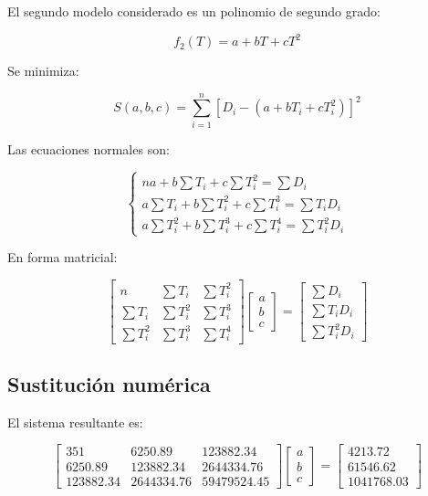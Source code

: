 \documentclass[12pt,a4paper]{article}
\newcommand{\modeloCuadratico}{f_2(T)=a+bT+cT^2}
\begin{document}
El segundo modelo considerado es un polinomio de segundo grado:

\[
    \modeloCuadratico
\]

Se minimiza:

\[
    S(a,b,c)=\sum_{i=1}^{n}\left[D_i-(a+bT_i+cT_i^2)\right]^2
\]

Las ecuaciones normales son:

\[
\begin{cases}
na + b\sum T_i + c\sum T_i^2 = \sum D_i \\
a\sum T_i + b\sum T_i^2 + c\sum T_i^3 = \sum T_iD_i \\
a\sum T_i^2 + b\sum T_i^3 + c\sum T_i^4 = \sum T_i^2D_i
\end{cases}
\]

En forma matricial:

\[
\begin{bmatrix}
n & \sum T_i & \sum T_i^2 \\
\sum T_i & \sum T_i^2 & \sum T_i^3 \\
\sum T_i^2 & \sum T_i^3 & \sum T_i^4
\end{bmatrix}
\begin{bmatrix}
a \\
b \\
c
\end{bmatrix}
=
\begin{bmatrix}
\sum D_i \\
\sum T_iD_i \\
\sum T_i^2D_i
\end{bmatrix}
\]

\subsection{Sustitución numérica}

\begin{table}[H]
\centering
\caption{Sumas utilizadas en el ajuste cuadrático}
\label{tab:sumas-cuadratico}

\end{table}

El sistema resultante es:

\[
\begin{bmatrix}
\num{351} & \num{6250.89} & \num{123882.34} \\
\num{6250.89} & \num{123882.34} & \num{2644334.76} \\
\num{123882.34} & \num{2644334.76} & \num{59479524.45}
\end{bmatrix}
\begin{bmatrix}
a \\
b \\
c
\end{bmatrix}
=
\begin{bmatrix}
\num{4213.72} \\
\num{61546.62} \\
\num{1041768.03}
\end{bmatrix}
\]
\end{document}
